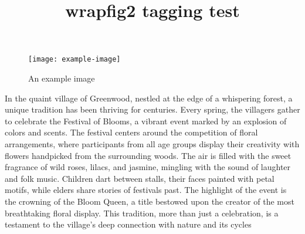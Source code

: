 \documentclass{article}
\title{wrapfig2 tagging test}
\begin{document}
\begin{wrapfigure}{R}{0.4\textwidth}
    \texttt{[image: example-image]}
    \caption{An example image}
\end{wrapfigure}

In the quaint village of Greenwood, nestled at the edge of a whispering forest,
a unique tradition has been thriving for centuries. Every spring, the villagers
gather to celebrate the Festival of Blooms, a vibrant event marked by an
explosion of colors and scents. The festival centers around the competition of
floral arrangements, where participants from all age groups display their
creativity with flowers handpicked from the surrounding woods. The air is filled
with the sweet fragrance of wild roses, lilacs, and jasmine, mingling with the
sound of laughter and folk music. Children dart between stalls, their faces
painted with petal motifs, while elders share stories of festivals past. The
highlight of the event is the crowning of the Bloom Queen, a title bestowed upon
the creator of the most breathtaking floral display. This tradition, more than
just a celebration, is a testament to the village's deep connection with nature
and its cycles
\end{document}
